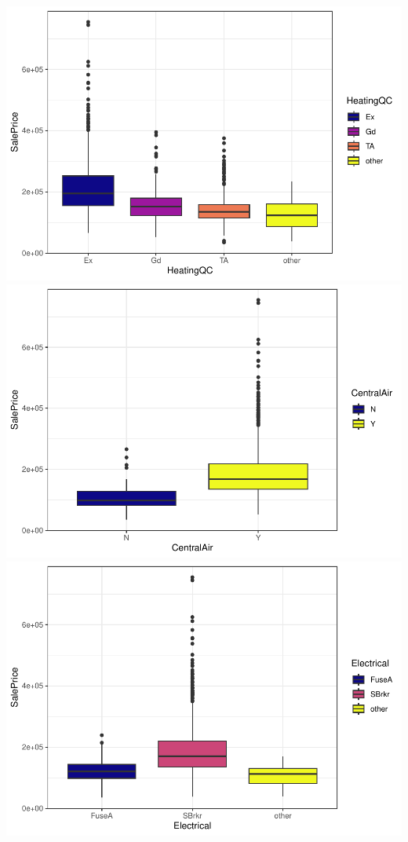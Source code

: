 \documentclass[
]{article}
\begin{document}
\includegraphics{report_files/figure-latex/categorical variables-22.pdf}
\includegraphics{report_files/figure-latex/categorical variables-23.pdf}
\includegraphics{report_files/figure-latex/categorical variables-24.pdf}
\end{document}
